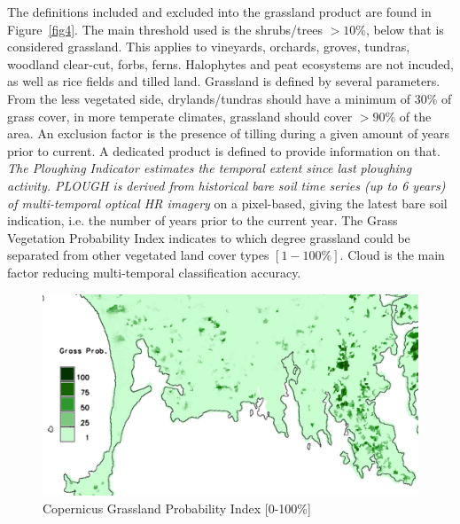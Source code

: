 \documentclass[a4paper,11.5pt,onecolumn]{article}
\begin{document}
\newpage
\noindent The definitions included and excluded into the grassland product are found in Figure~\ref{fig4}. The main threshold used is the shrubs/trees $>10\%$, below that is considered grassland. This applies to vineyards, orchards, groves, tundras, woodland clear-cut, forbs, ferns. Halophytes and peat ecosystems are not incuded, as well as rice fields and tilled land.\newline\linebreak
\noindent Grassland is defined by several parameters. From the less vegetated side, drylands/tundras should have a minimum of $30\%$ of grass cover, in more temperate climates, grassland should cover $> 90\%$ of the area. An exclusion factor is the presence of tilling during a given amount of years prior to current. A dedicated product is defined to provide information on that. \textit{The Ploughing Indicator estimates the temporal extent since last ploughing activity. PLOUGH is
derived from historical bare soil time series (up to 6 years) of multi-temporal optical HR imagery} on a pixel-based, giving the latest bare soil indication, i.e. the number of years prior to the current year.\newline\linebreak
\noindent The Grass Vegetation Probability Index indicates to which degree
grassland could be separated from other vegetated land cover types $[1-100\%]$. Cloud is the main factor reducing multi-temporal classification accuracy.\newline\linebreak

\begin{figure}[htbp]
\includegraphics[width=\textwidth]{images/grasspvi_zoomed.png}
\caption{Copernicus Grassland Probability Index [0-100\%]}
\label{fig5}
\end{figure}
\end{document}
